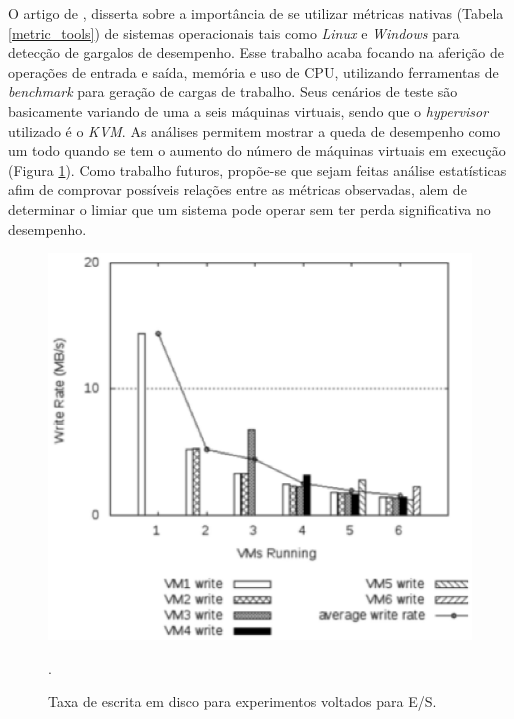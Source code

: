 O artigo de , disserta sobre a importância de se utilizar métricas nativas (Tabela \ref{metric_tools}) de sistemas  operacionais tais como \textit{Linux} e \textit{Windows} para detecção de gargalos de desempenho. Esse trabalho acaba focando na aferição de operações de entrada e saída, memória e uso de CPU, utilizando ferramentas de \textit{benchmark} para geração de cargas de trabalho. Seus cenários de teste são basicamente variando de uma a seis máquinas virtuais, sendo que o \textit{hypervisor} utilizado é o \textit{KVM}. As análises permitem mostrar a queda de desempenho como um todo quando se tem o aumento do número de máquinas virtuais em execução (Figura \ref{iobound_experiments}). Como trabalho futuros, propõe-se que sejam feitas análise estatísticas afim de comprovar possíveis relações entre as métricas observadas, alem de determinar o limiar que um sistema pode operar sem ter perda significativa no desempenho.
\begin{figure}[!htb]
\centering
\includegraphics [keepaspectratio=true,scale=0.6]{figuras/iobound_experiments.eps}
\caption{Taxa de escrita em disco para experimentos voltados para E/S.}
\cite{popiolek2012}.
\label{iobound_experiments}
\end{figure}

